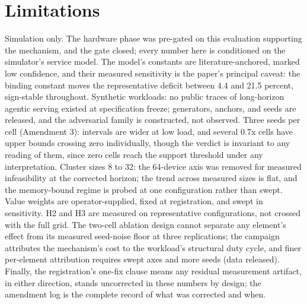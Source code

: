 \section{Limitations}

Simulation only. The hardware phase was pre-gated on this evaluation
supporting the mechanism, and the gate closed; every number here is
conditioned on the simulator's service model. The model's constants are
literature-anchored, marked low confidence, and their measured sensitivity
is the paper's principal caveat: the binding constant moves the
representative deficit between 4.4 and 21.5 percent, sign-stable
throughout. Synthetic workloads: no public traces of long-horizon agentic
serving existed at specification freeze; generators, anchors, and seeds
are released, and the adversarial family is constructed, not observed.
Three seeds per cell (Amendment 3): intervals are wider at low load, and
several 0.7x cells have upper bounds crossing zero individually, though
the verdict is invariant to any reading of them, since zero cells reach
the support threshold under any interpretation. Cluster sizes 8 to 32:
the 64-device axis was removed for measured infeasibility at the
corrected horizon; the trend across measured sizes is flat, and the
memory-bound regime is probed at one configuration rather than swept.
Value weights are operator-supplied, fixed at registration, and swept in
sensitivity. H2 and H3 are measured on representative configurations, not
crossed with the full grid. The two-cell ablation design cannot separate
any element's effect from its measured seed-noise floor at three
replications; the campaign attributes the mechanism's cost to the
workload's structural duty cycle, and finer per-element attribution
requires swept axes and more seeds (data released). Finally, the
registration's one-fix clause means any residual measurement artifact, in
either direction, stands uncorrected in these numbers by design; the
amendment log is the complete record of what was corrected and when.
